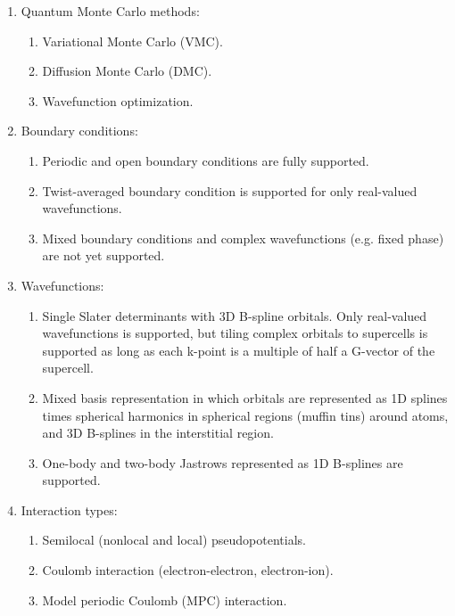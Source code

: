 \begin{enumerate}

  \item Quantum Monte Carlo methods:

    \begin{enumerate}
	\item Variational Monte Carlo (VMC).
	\item Diffusion Monte Carlo (DMC).
	\item Wavefunction optimization.
    \end{enumerate}

  \item Boundary conditions:

    \begin{enumerate}
	\item Periodic and open boundary conditions are fully supported.
	\item Twist-averaged boundary condition is supported for only real-valued wavefunctions.
	\item Mixed boundary conditions and complex wavefunctions (e.g. fixed phase) are not yet supported. 
    \end{enumerate}

  \item Wavefunctions:

    \begin{enumerate}
	\item Single Slater determinants with 3D B-spline orbitals. Only real-valued wavefunctions is supported, but tiling complex orbitals to supercells is supported as long as each k-point is a multiple of half a G-vector of the supercell.
	\item Mixed basis representation in which orbitals are represented as 1D splines times spherical harmonics in spherical regions (muffin tins) around atoms, and 3D B-splines in the interstitial region.
	\item One-body and two-body Jastrows represented as 1D B-splines are supported. %
    \end{enumerate}

  \item Interaction types:

    \begin{enumerate}
	\item Semilocal (nonlocal and local) pseudopotentials.
	\item Coulomb interaction (electron-electron, electron-ion).
	\item Model periodic Coulomb (MPC) interaction.
    \end{enumerate}

\end{enumerate}

